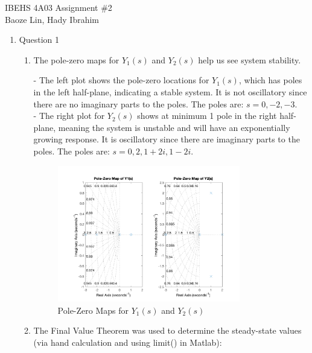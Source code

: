 \documentclass[12pt]{article}
\begin{document}
IBEHS 4A03 \hfill Assignment \#2\\
Baoze Lin, Hady Ibrahim

\hrulefill

\renewcommand{\theenumii}{\arabic{enumi}.\arabic{enumii}}

\begin{enumerate}
\item Question 1
  \begin{enumerate}
    \item
    The pole-zero maps for \( Y_1(s) \) and \( Y_2(s) \) help us see system stability. 

    - The left plot shows the pole-zero locations for \( Y_1(s) \), which has poles in the left half-plane, indicating a stable system. It is not oscillatory since there are no imaginary parts to the poles. The poles are: $s=0, -2, -3$. \\
    - The right plot for \( Y_2(s) \) shows at minimum 1 pole in the right half-plane, meaning the system is unstable and will have an exponentially growing response. It is oscillatory since there are imaginary parts to the poles. The poles are: $s=0, 2, 1+2i, 1-2i$.

    \begin{figure}[H]
      \centering
      \includegraphics[width=0.8\textwidth]{Figures/figure1-1.png}
      \caption{Pole-Zero Maps for \( Y_1(s) \) and \( Y_2(s) \)}
      \label{fig:figure11} 
    \end{figure}

    \pagebreak
    \item
    The Final Value Theorem was used to determine the steady-state values (via hand calculation and using limit() in Matlab):


\end{enumerate}
\end{enumerate}
\end{document}
